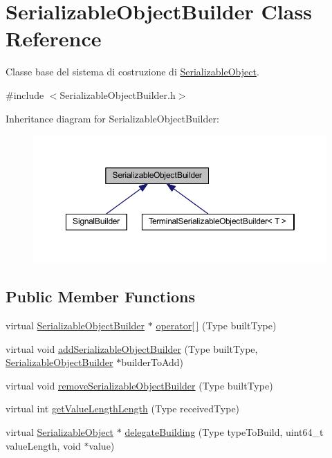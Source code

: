 \hypertarget{class_serializable_object_builder}{
\section{SerializableObjectBuilder Class Reference}
\label{class_serializable_object_builder}
}


Classe base del sistema di costruzione di \hyperlink{class_serializable_object}{SerializableObject}.  




{\ttfamily \#include $<$SerializableObjectBuilder.h$>$}



Inheritance diagram for SerializableObjectBuilder:\nopagebreak
\begin{figure}[H]
\begin{center}
\leavevmode
\includegraphics[width=357pt]{class_serializable_object_builder__inherit__graph}
\end{center}
\end{figure}
\subsection*{Public Member Functions}
\begin{DoxyCompactItemize}
\item 
virtual \hyperlink{class_serializable_object_builder}{SerializableObjectBuilder} $\ast$ \hyperlink{class_serializable_object_builder_a522f0b5ab4a1eb3e8873b89d1ebd984e}{operator\mbox{[}$\,$\mbox{]}} (Type builtType)
\item 
virtual void \hyperlink{class_serializable_object_builder_a3f15f4b592db9d364abe84c5fe7e6a94}{addSerializableObjectBuilder} (Type builtType, \hyperlink{class_serializable_object_builder}{SerializableObjectBuilder} $\ast$builderToAdd)
\item 
virtual void \hyperlink{class_serializable_object_builder_a0f2a0dace2f27d93f7834b494a1d6d4c}{removeSerializableObjectBuilder} (Type builtType)
\item 
virtual int \hyperlink{class_serializable_object_builder_abd81916a15e1caa89a8c1c0a0d04e507}{getValueLengthLength} (Type receivedType)
\item 
virtual \hyperlink{class_serializable_object}{SerializableObject} $\ast$ \hyperlink{class_serializable_object_builder_af37621788ce2c245ab7e1f52f907d558}{delegateBuilding} (Type typeToBuild, uint64\_\-t valueLength, void $\ast$value)
\end{DoxyCompactItemize}
